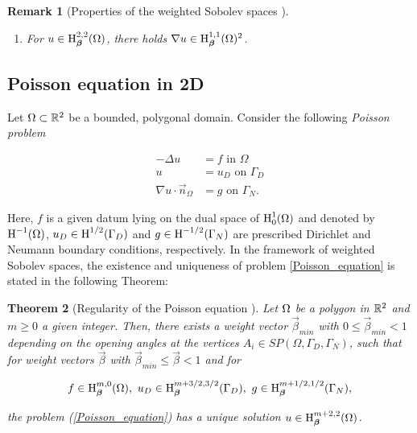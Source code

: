 \documentclass[a4paper,11pt]{article}
\newtheorem{theorem}{Theorem}
\newtheorem{remark}[theorem]{Remark}
\begin{document}
{\begin{remark}[Properties of the weighted Sobolev spaces {\cite[Remark 1.2.2]{Wihler:2003}}]
\begin{enumerate}
    \item For $u \in \operatorname H^{2,2}_{\boldsymbol \beta}(\Omega)$, there holds $\nabla u \in \operatorname H^{1,1}_{\boldsymbol \beta}(\Omega)^{2}$.

\end{enumerate}
    
\end{remark}


\subsection{Poisson equation in 2D}

Let $\Omega \subset \mathbb R^{2}$ be a bounded, polygonal domain. Consider the following \textit{Poisson problem}

\begin{equation}\label{Poisson_equation}
\begin{split}
 - \Delta u &  = f  \text{ in } \Omega \\
u &  = u_{D} \text{ on } \Gamma_{D}\\
\nabla u \cdot \vec{n}_{\Omega} & = g \text{ on } \Gamma_{N}.
\end{split}
\end{equation}

Here, $f$ is a given datum lying on the dual space of $\operatorname H^{1}_0(\Omega)$ and denoted by $\operatorname H^{-1}(\Omega)$, $u_{D} \in \operatorname H^{1/2}(\Gamma_{D})$ and $ g \in \operatorname H^{-1/2}(\Gamma_{N})$ are prescribed Dirichlet and Neumann boundary conditions, respectively. In the framework of weighted Sobolev spaces, the existence and uniqueness of problem \eqref{Poisson_equation} is stated in the following Theorem:

\begin{theorem}[Regularity of the Poisson equation {\cite[Theorem 3.1]{BG:1988}}] \label{thm:regularity}
Let $\Omega$ be a polygon in $\mathbb R^2$ and $m \geq 0$ a given integer. Then, there exists a weight vector $\vec{\beta}_{min}$ with $0 \leq \vec{\beta}_{min} < 1$ depending on the opening angles at the vertices $A_{i} \in  \textit{SP}(\Omega,\Gamma_{D},\Gamma_{N})$, such that for weight vectors $\vec{\beta}$ with $\vec{\beta}_{min} \leq \vec{\beta} < 1$ and for 

$$ f \in  \operatorname H^{m,0}_{\boldsymbol \beta}(\Omega), \ u_{D} \in \operatorname H^{m + 3/2,3/2}_{\boldsymbol \beta}(\Gamma_{D}), \ g \in \operatorname H^{m+1/2,1/2}_{\boldsymbol \beta}(\Gamma_{N}),$$

the problem (\ref{Poisson_equation}) has a unique solution $u \in \operatorname H^{m+2,2}_{\boldsymbol \beta}(\Omega)$.    
\end{theorem}


}
\end{document}
